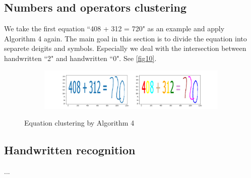 \subsection{Numbers and operators clustering}
We take the first equation ``408 + 312 = 720" as an example and apply Algorithm 4 again.
The main goal in this section is to divide the equation into separete deigits and symbols. Especially we deal with the intersection between handwritten ``2" and handwritten ``0". See \autoref{fig10}.

\begin{figure}[htbp]
    \vspace{-1em}
    \centering
    \begin{subfigure}[t]{0.6\textwidth}
        \includegraphics[width=\textwidth]{720_formula_output_1.png}
    \end{subfigure}
    \caption{Equation clustering by Algorithm 4}\label{fig10}
\end{figure}

\subsection{Handwritten recognition}
...